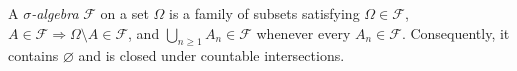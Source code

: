 
A \emph{$\sigma$-algebra} $\mathcal F$ on a set $\Omega$ is a family of subsets satisfying $\Omega\in\mathcal F$, $A\in\mathcal F\Rightarrow\Omega\setminus A\in\mathcal F$, and $\bigcup_{n\ge1}A_n\in\mathcal F$ whenever every $A_n\in\mathcal F$. Consequently, it contains $\varnothing$ and is closed under countable intersections.
